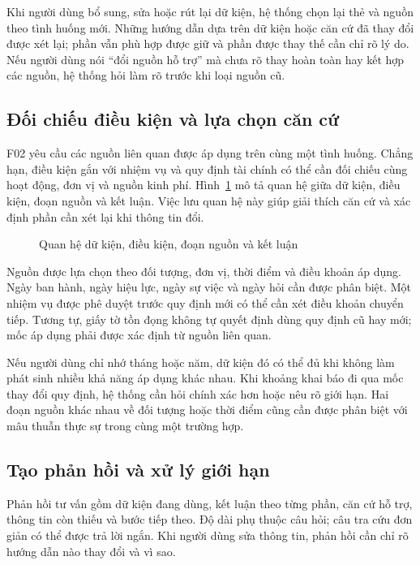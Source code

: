 Khi người dùng bổ sung, sửa hoặc rút lại dữ kiện, hệ thống chọn lại thẻ và
nguồn theo tình huống mới. Những hướng dẫn dựa trên dữ kiện hoặc căn cứ đã
thay đổi được xét lại; phần vẫn phù hợp được giữ và phần được thay thế cần
chỉ rõ lý do. Nếu người dùng nói ``đổi nguồn hỗ trợ'' mà chưa rõ thay hoàn
toàn hay kết hợp các nguồn, hệ thống hỏi làm rõ trước khi loại nguồn cũ.

\subsection{Đối chiếu điều kiện và lựa chọn căn cứ}
F02 yêu cầu các nguồn liên quan được áp dụng trên cùng một tình huống.
Chẳng hạn, điều kiện gắn với nhiệm vụ và quy định tài chính có thể cần đối
chiếu cùng hoạt động, đơn vị và nguồn kinh phí. Hình~\ref{fig:phu-thuoc} mô
tả quan hệ giữa dữ kiện, điều kiện, đoạn nguồn và kết luận. Việc lưu quan
hệ này giúp giải thích căn cứ và xác định phần cần xét lại khi thông tin đổi.

\begin{figure}[H]
\centering
\caption{Quan hệ dữ kiện, điều kiện, đoạn nguồn và kết luận}
\label{fig:phu-thuoc}
\end{figure}

Nguồn được lựa chọn theo đối tượng, đơn vị, thời điểm và điều khoản áp dụng.
Ngày ban hành, ngày hiệu lực, ngày sự việc và ngày hỏi cần được phân biệt.
Một nhiệm vụ được phê duyệt trước quy định mới có thể cần xét điều khoản
chuyển tiếp. Tương tự, giấy tờ tồn đọng không tự quyết định dùng quy định
cũ hay mới; mốc áp dụng phải được xác định từ nguồn liên quan.

Nếu người dùng chỉ nhớ tháng hoặc năm, dữ kiện đó có thể đủ khi không làm
phát sinh nhiều khả năng áp dụng khác nhau. Khi khoảng khai báo đi qua mốc
thay đổi quy định, hệ thống cần hỏi chính xác hơn hoặc nêu rõ giới hạn.
Hai đoạn nguồn khác nhau về đối tượng hoặc thời điểm cũng cần được phân
biệt với mâu thuẫn thực sự trong cùng một trường hợp.

\subsection{Tạo phản hồi và xử lý giới hạn}
Phản hồi tư vấn gồm dữ kiện đang dùng, kết luận theo từng phần, căn cứ hỗ
trợ, thông tin còn thiếu và bước tiếp theo. Độ dài phụ thuộc câu hỏi; câu
tra cứu đơn giản có thể được trả lời ngắn. Khi người dùng sửa thông tin,
phản hồi cần chỉ rõ hướng dẫn nào thay đổi và vì sao.

